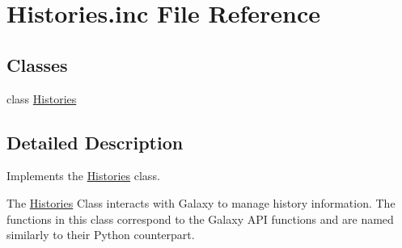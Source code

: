 \hypertarget{Histories_8inc}{}\section{Histories.\+inc File Reference}
\label{Histories_8inc}
\subsection*{Classes}
\begin{DoxyCompactItemize}
\item 
class \hyperlink{classHistories}{Histories}
\end{DoxyCompactItemize}


\subsection{Detailed Description}
Implements the \hyperlink{classHistories}{Histories} class.

The \hyperlink{classHistories}{Histories} Class interacts with Galaxy to manage history information. The functions in this class correspond to the Galaxy A\+PI functions and are named similarly to their Python counterpart. 